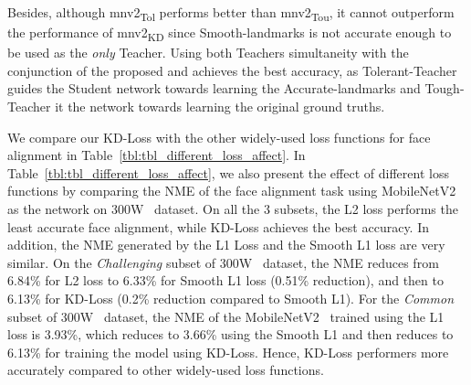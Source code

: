 \documentclass[times,twocolumn,final,authoryear]{elsarticle}
\begin{document}
Besides, although mnv2\textsubscript{Tol} performs better than mnv2\textsubscript{Tou}, it cannot outperform the performance of mnv2\textsubscript{KD} since Smooth-landmarks is not accurate enough to be used as the \textit{only} Teacher. Using both Teachers simultaneity with the conjunction of the proposed  and  achieves the best accuracy, as Tolerant-Teacher guides the Student network towards learning the Accurate-landmarks and Tough-Teacher it the network towards learning the original ground truths.

We compare our KD-Loss with the other widely-used loss functions for face alignment in Table~\ref{tbl:tbl_different_loss_affect}. In Table~\ref{tbl:tbl_different_loss_affect}, we also present the effect of different loss functions by comparing the NME of the face alignment task using MobileNetV2~\cite{sandler2018MobileNetV2} as the network on 300W~\cite{sagonas2013300} dataset. On all the 3 subsets, the L2 loss performs the least accurate face alignment, while KD-Loss achieves the best accuracy. In addition, the NME generated by the L1 Loss and the Smooth L1 loss are very similar. On the \textit{Challenging} subset of 300W~\cite{sagonas2013300} dataset, the NME reduces from 6.84\% for L2 loss to 6.33\% for Smooth L1 loss (0.51\% reduction), and then to 6.13\% for KD-Loss (0.2\% reduction compared to Smooth L1). For the \textit{Common} subset of 300W~\cite{sagonas2013300} dataset, the NME of the MobileNetV2~\cite{sandler2018MobileNetV2} trained using the L1 loss is 3.93\%, which reduces to 3.66\% using the Smooth L1 and then reduces to 6.13\% for training the model using KD-Loss. Hence, KD-Loss performers more accurately compared to other widely-used loss functions.
\end{document}
